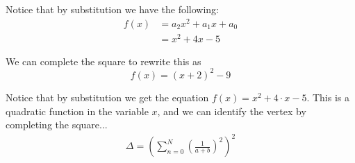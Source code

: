 \documentclass{article}
\begin{document}

Notice that by substitution we have the following:
\begin{align*}
    f(x) & = a_2 x^2 + a_1 x + a_0 \\
         & = x^2 + 4x - 5
\end{align*}

We can complete the square to rewrite this as
\[ f(x) = (x + 2)^2 - 9 \]

Notice that by substitution we get the equation \(f(x) = x^2 + 4 \cdot x - 5\). This is a quadratic function in the variable \(x\), and we can identify the vertex by completing the square...
\begin{align*}
    \Delta = \left( \sum_{n=0}^N \left( \frac{1}{a + b} \right)^2 \right)^2
\end{align*}
\end{document}

